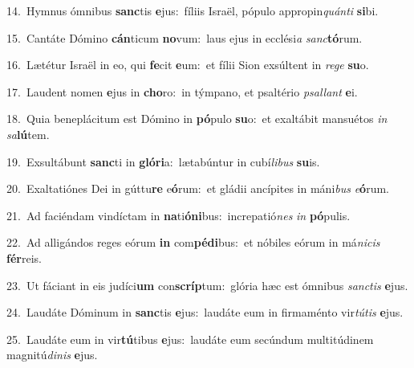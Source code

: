 {\numbfont\textcolor{\numbcolor}{14.}}~Hymnus ómnibus \textbf{sanc}\-tis \textbf{e}\-jus:~\star fíliis Israël, pópulo appropin\-\textit{quán}\-\textit{ti} \textbf{si}\-bi.\par
{\numbfont\textcolor{\numbcolor}{15.}}~Cantáte Dómino \textbf{cán}\-ticum \textbf{no}\-vum:~\star laus ejus in ecclési\textit{a} \textit{sanc}\-\textbf{tó}rum.\par
{\numbfont\textcolor{\numbcolor}{16.}}~Lætétur Israël in eo, qui \textbf{fe}\-cit \textbf{e}\-um:~\star et fílii Sion exsúltent in \textit{re}\-\textit{ge} \textbf{su}\-o.\par
{\numbfont\textcolor{\numbcolor}{17.}}~Laudent nomen \textbf{e}\-jus in \textbf{cho}\-ro:~\star in týmpano, et psaltério \textit{psal}\-\textit{lant} \textbf{e}\-i.\par
{\numbfont\textcolor{\numbcolor}{18.}}~Quia beneplácitum est Dómino in \textbf{pó}\-pulo \textbf{su}\-o:~\star et exaltábit mansuétos \textit{in} \textit{sa}\-\textbf{lú}tem.\par
{\numbfont\textcolor{\numbcolor}{19.}}~Exsultábunt \textbf{sanc}\-ti in \textbf{gló}\-\textbf{ri}a:~\star lætabúntur in cubí\-\textit{li}\-\textit{bus} \textbf{su}\-is.\par
{\numbfont\textcolor{\numbcolor}{20.}}~Exaltatiónes Dei in gúttu\textbf{re} e\-\textbf{ó}\-rum:~\star et gládii ancípites in máni\textit{bus} \textit{e}\-\textbf{ó}rum.\par
{\numbfont\textcolor{\numbcolor}{21.}}~Ad faciéndam vindíctam in \textbf{na}\-ti\-\textbf{ó}\-\textbf{ni}bus:~\star increpatió\textit{nes} \textit{in} \textbf{pó}\-pulis.\par
{\numbfont\textcolor{\numbcolor}{22.}}~Ad alligándos reges eórum \textbf{in} com\-\textbf{pé}\-\textbf{di}bus:~\star et nóbiles eórum in má\-\textit{ni}\-\textit{cis} \textbf{fér}\-reis.\par
{\numbfont\textcolor{\numbcolor}{23.}}~Ut fáciant in eis judíci\textbf{um} con\-\textbf{scríp}\-tum:~\star glória hæc est ómnibus \textit{sanc}\-\textit{tis} \textbf{e}\-jus.\par
{\numbfont\textcolor{\numbcolor}{24.}}~Laudáte Dóminum in \textbf{sanc}\-tis \textbf{e}\-jus:~\star laudáte eum in firmaménto vir\-\textit{tú}\-\textit{tis} \textbf{e}\-jus.\par
{\numbfont\textcolor{\numbcolor}{25.}}~Laudáte eum in vir\-\textbf{tú}\-tibus \textbf{e}\-jus:~\star laudáte eum secúndum multitúdinem magnitú\-\textit{di}\-\textit{nis} \textbf{e}\-jus.\par
